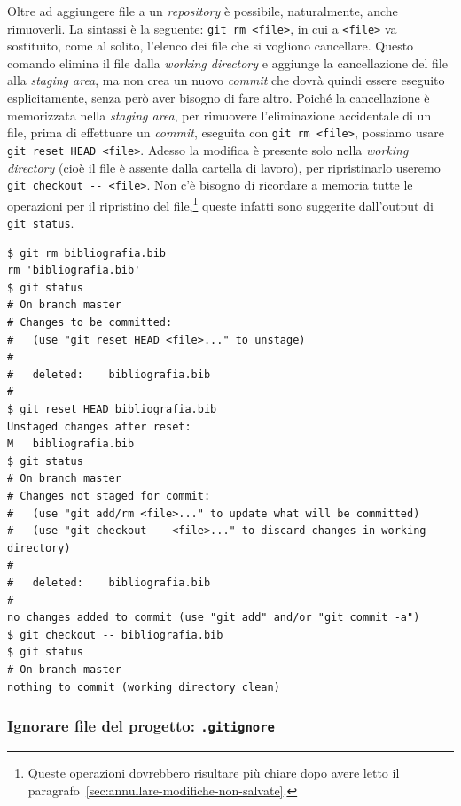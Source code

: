 \documentclass[a4paper,12pt,oneside]{article}
\begin{document}
Oltre ad aggiungere file a un \emph{repository} è possibile, naturalmente, anche
rimuoverli. La sintassi è la seguente:
\lstinline[emph={}]|git rm <file>|, in cui a \lstinline|<file>| va
sostituito, come al solito, l'elenco dei file che si vogliono cancellare. Questo
comando elimina il file dalla \emph{working directory} e aggiunge la
cancellazione del file alla \emph{staging area}, ma non crea un nuovo
\emph{commit} che dovrà quindi essere eseguito esplicitamente, senza però aver
bisogno di fare altro. Poiché la cancellazione è memorizzata nella
\emph{staging area}, per rimuovere l'eliminazione accidentale di un file, prima
di effettuare un \emph{commit}, eseguita con
\lstinline[emph={}]|git rm <file>|, possiamo usare
\lstinline|git reset HEAD <file>|. Adesso la modifica è presente solo nella
\emph{working directory} (cioè il file è assente dalla cartella di lavoro), per
ripristinarlo useremo \lstinline|git checkout -- <file>|. Non c'è bisogno di
ricordare a memoria tutte le operazioni per il ripristino del
file,\footnote{Queste operazioni dovrebbero   risultare più chiare dopo avere
  letto il paragrafo~\ref{sec:annullare-modifiche-non-salvate}.} queste infatti
sono suggerite dall'output di \lstinline|git status|.
\begin{lstlisting}
$ git rm bibliografia.bib
rm 'bibliografia.bib'
$ git status
# On branch master
# Changes to be committed:
#   (use "git reset HEAD <file>..." to unstage)
#
#	deleted:    bibliografia.bib
#
$ git reset HEAD bibliografia.bib
Unstaged changes after reset:
M	bibliografia.bib
$ git status
# On branch master
# Changes not staged for commit:
#   (use "git add/rm <file>..." to update what will be committed)
#   (use "git checkout -- <file>..." to discard changes in working directory)
#
#	deleted:    bibliografia.bib
#
no changes added to commit (use "git add" and/or "git commit -a")
$ git checkout -- bibliografia.bib
$ git status
# On branch master
nothing to commit (working directory clean)
\end{lstlisting}

\subsubsection{Ignorare file del progetto: \lstinline|.gitignore|}
\label{sec:ignorare-file}
\end{document}

